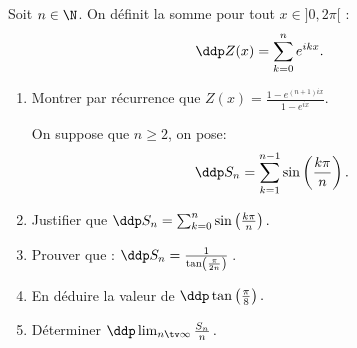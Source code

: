 


\begin{exercice}
 Soit  $n\in \N$. On définit la somme pour tout $x \in ]0, 2\pi[$ :
$$\ddp Z(x) =\sum_{k=0}^n e^{ikx}.$$
\begin{enumerate}
\item Montrer par récurrence que $Z(x) = \frac{1-e^{(n+1)ix}}{1-e^{ix}}$.

On suppose que $n\geq 2$, on pose: 
$$\ddp S_n = \sum_{k=1}^{n-1} \sin \left( \frac{k\pi}{n}\right).$$
\item Justifier que $\ddp S_n = \sum_{k=0}^{n} \sin \left( \frac{k\pi}{n}\right).$\\
\item Prouver que : $\ddp S_n = \frac{1}{ \tan \left( \frac{\pi}{2n}\right)}\, $.\\
\item En déduire la valeur de $\ddp \tan \left( \frac{\pi}{8}\right).$\\
\item Déterminer $\ddp \lim_{n\tv \infty} \frac{S_n}{n}\, .$
\end{enumerate}
\end{exercice}


